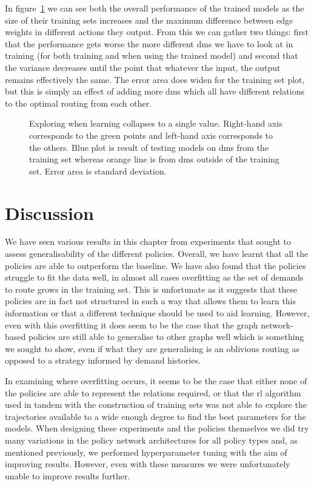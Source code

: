 In figure~\ref{fig:exp_fail} we can see both the overall performance of the trained models as the size of their training sets increases and the maximum difference between edge weights in different actions they output. From this we can gather two things: first that the performance gets worse the more different \acp{dm} we have to look at in training (for both training and when using the trained model) and second that the variance decreases until the point that whatever the input, the output remains effectively the same. The error area does widen for the training set plot, but this is simply an effect of adding more \acp{dm} which all have different relations to the optimal routing from each other.

\begin{figure}
    \centering
    
    \caption{Exploring when learning collapses to a single value. Right-hand axis corresponds to the green points and left-hand axis corresponds to the others. Blue plot is result of testing models on \acp{dm} from the training set whereas orange line is from \acp{dm} outside of the training set. Error area is standard deviation.}
    \label{fig:exp_fail}
\end{figure}


\section{Discussion}
We have seen various results in this chapter from experiments that sought to assess generalisability of the different policies. Overall, we have learnt that all the policies are able to outperform the baseline. We have also found that the policies struggle to fit the data well, in almost all cases overfitting as the set of demands to route grows in the training set. This is unfortunate as it suggests that these policies are in fact not structured in such a way that allows them to learn this information or that a different technique should be used to aid learning. However, even with this overfitting it does seem to be the case that the graph network-based policies are still able to generalise to other graphs well which is something we sought to show, even if what they are generalising is an oblivious routing as opposed to a strategy informed by demand histories.

In examining where overfitting occurs, it seems to be the case that either none of the policies are able to represent the relations required, or that the \ac{rl} algorithm used in tandem with the construction of training sets was not able to explore the trajectories available to a wide enough degree to find the best parameters for the models. When designing these experiments and the policies themselves we did try many variations in the policy network architectures for all policy types and, as mentioned previously, we performed hyperparameter tuning with the aim of improving results. However, even with these measures we were unfortunately unable to improve results further.


